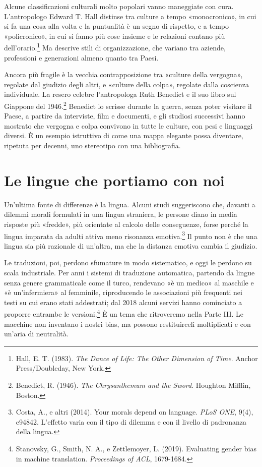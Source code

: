 Alcune classificazioni culturali molto popolari vanno maneggiate con cura. L'antropologo Edward T. Hall distinse tra culture a tempo «monocronico», in cui si fa una cosa alla volta e la puntualità è un segno di rispetto, e a tempo «policronico», in cui si fanno più cose insieme e le relazioni contano più dell'orario.\footnote{Hall, E. T. (1983). \textit{The Dance of Life: The Other Dimension of Time}. Anchor Press/Doubleday, New York.} Ma descrive stili di organizzazione, che variano tra aziende, professioni e generazioni almeno quanto tra Paesi.

Ancora più fragile è la vecchia contrapposizione tra «culture della vergogna», regolate dal giudizio degli altri, e «culture della colpa», regolate dalla coscienza individuale. La resero celebre l'antropologa Ruth Benedict e il suo libro sul Giappone del 1946.\footnote{Benedict, R. (1946). \textit{The Chrysanthemum and the Sword}. Houghton Mifflin, Boston.} Benedict lo scrisse durante la guerra, senza poter visitare il Paese, a partire da interviste, film e documenti, e gli studiosi successivi hanno mostrato che vergogna e colpa convivono in tutte le culture, con pesi e linguaggi diversi. È un esempio istruttivo di come una mappa elegante possa diventare, ripetuta per decenni, uno stereotipo con una bibliografia.

\section{Le lingue che portiamo con noi}

Un'ultima fonte di differenze è la lingua. Alcuni studi suggeriscono che, davanti a dilemmi morali formulati in una lingua straniera, le persone diano in media risposte più «fredde», più orientate al calcolo delle conseguenze, forse perché la lingua imparata da adulti attiva meno risonanza emotiva.\footnote{Costa, A., e altri (2014). Your morals depend on language. \textit{PLoS ONE}, 9(4), e94842. L'effetto varia con il tipo di dilemma e con il livello di padronanza della lingua.} Il punto non è che una lingua sia più razionale di un'altra, ma che la distanza emotiva cambia il giudizio.

Le traduzioni, poi, perdono sfumature in modo sistematico, e oggi le perdono su scala industriale. Per anni i sistemi di traduzione automatica, partendo da lingue senza genere grammaticale come il turco, rendevano «è un medico» al maschile e «è un'infermiera» al femminile, riproducendo le associazioni più frequenti nei testi su cui erano stati addestrati; dal 2018 alcuni servizi hanno cominciato a proporre entrambe le versioni.\footnote{Stanovsky, G., Smith, N. A., e Zettlemoyer, L. (2019). Evaluating gender bias in machine translation. \textit{Proceedings of ACL}, 1679-1684.} È un tema che ritroveremo nella Parte III. Le macchine non inventano i nostri bias, ma possono restituirceli moltiplicati e con un'aria di neutralità.

